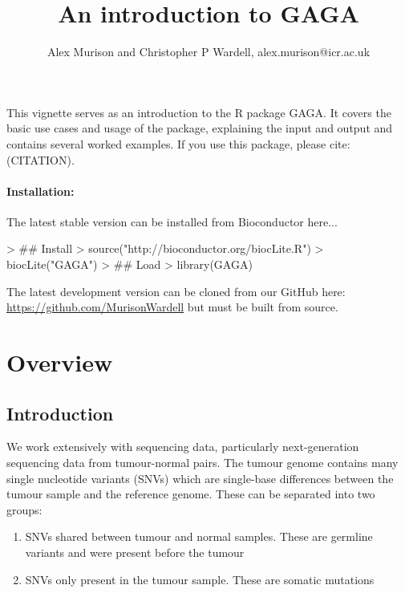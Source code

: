 \documentclass{article}
\begin{document}


\title{An introduction to GAGA}
\author{Alex Murison and Christopher P Wardell, alex.murison@icr.ac.uk}
\maketitle

This vignette serves as an introduction to the R package GAGA.  It covers the basic use cases and usage of the package, explaining the input and output and contains several worked examples.  If you use this package, please cite: (CITATION).

\paragraph{Installation:} The latest stable version can be installed from Bioconductor here...
 
\begin{Schunk}
\begin{Sinput}
> ## Install
> source("http://bioconductor.org/biocLite.R")
> biocLite("GAGA")
> ## Load
> library(GAGA)
\end{Sinput}
\end{Schunk}

The latest development version can be cloned from our GitHub here: \href{https://github.com/MurisonWardell}{https://github.com/MurisonWardell} but must be built from source.

\pagebreak
\tableofcontents
\pagebreak

\section{Overview}
\subsection{Introduction}
We work extensively with sequencing data, particularly next-generation sequencing data from tumour-normal pairs.  The tumour genome contains many single nucleotide variants (SNVs) which are single-base differences between the tumour sample and the reference genome.  These can be separated into two groups:

\begin{enumerate}
   \item SNVs shared between tumour and normal samples.  These are germline variants and were present before the tumour
   \item SNVs only present in the tumour sample.  These are somatic mutations
\end{enumerate}
\end{document}
